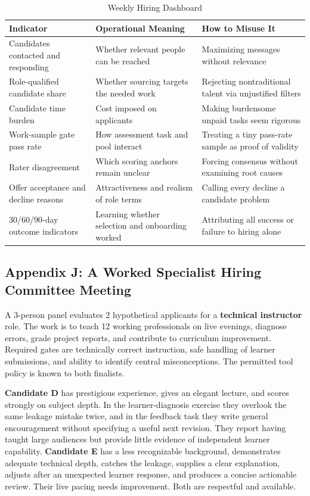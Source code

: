 \begin{table}[t]
\centering
\small
\caption{Weekly Hiring Dashboard}
\label{tab:weekly_hiring_dashboard}
\begin{tabularx}{\textwidth}{p{4.2cm} p{5.5cm} X}
\toprule
\textbf{Indicator} & \textbf{Operational Meaning} & \textbf{How to Misuse It} \\
\midrule
Candidates contacted and responding & Whether relevant people can be reached & Maximizing messages without relevance \\
Role-qualified candidate share & Whether sourcing targets the needed work & Rejecting nontraditional talent via unjustified filters \\
Candidate time burden & Cost imposed on applicants & Making burdensome unpaid tasks seem rigorous \\
Work-sample gate pass rate & How assessment task and pool interact & Treating a tiny pass-rate sample as proof of validity \\
Rater disagreement & Which scoring anchors remain unclear & Forcing consensus without examining root causes \\
Offer acceptance and decline reasons & Attractiveness and realism of role terms & Calling every decline a candidate problem \\
30/60/90-day outcome indicators & Learning whether selection and onboarding worked & Attributing all success or failure to hiring alone \\
\bottomrule
\end{tabularx}
\end{table}

\subsection*{Appendix J: A Worked Specialist Hiring Committee Meeting}

A 3-person panel evaluates 2 hypothetical applicants for a \textbf{technical instructor} role. The work is to teach 12 working professionals on live evenings, diagnose errors, grade project reports, and contribute to curriculum improvement. Required gates are technically correct instruction, safe handling of learner submissions, and ability to identify central misconceptions. The permitted tool policy is known to both finalists.

\textbf{Candidate D} has prestigious experience, gives an elegant lecture, and scores strongly on subject depth. In the learner-diagnosis exercise they overlook the same leakage mistake twice, and in the feedback task they write general encouragement without specifying a useful next revision. They report having taught large audiences but provide little evidence of independent learner capability. \textbf{Candidate E} has a less recognizable background, demonstrates adequate technical depth, catches the leakage, supplies a clear explanation, adjusts after an unexpected learner response, and produces a concise actionable review. Their live pacing needs improvement. Both are respectful and available.

